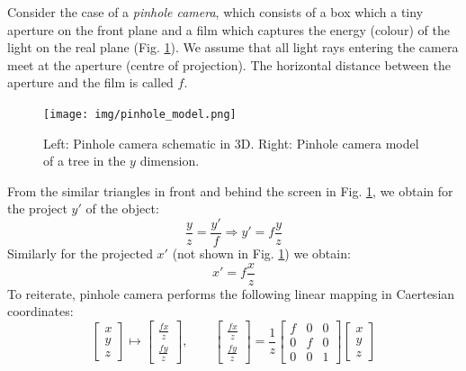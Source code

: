 \documentclass[a4paper]{article}
\begin{document}
%
   Consider the case of a \textit{pinhole camera}, which consists of a box which a tiny aperture on the front plane and a film which captures the energy (colour) of the light on the real plane (Fig. \ref{fig:pinhole_model}). We assume that all light rays entering the camera meet at the aperture (centre of projection). The horizontal distance between the aperture and the film is called  $f$.
    \begin{figure}[H]
        \centering
        \texttt{[image: img/pinhole\_model.png]}
        \caption{Left: Pinhole camera schematic in 3D. Right: Pinhole camera model of a tree in the $y$ dimension.}
        \label{fig:pinhole_model}
    \end{figure}

    From the similar triangles in front and behind the screen in Fig. \ref{fig:pinhole_model}, we obtain for the project $y\prime$ of the object:
    \[
        \frac{y}{z} = \frac{y\prime}{f} \Rightarrow y\prime = f\frac{y}{z}
    \]
    Similarly for the projected $x\prime$ (not shown in Fig. \ref{fig:pinhole_model}) we obtain:
    \[
        x\prime = f\frac{x}{z}
    \]
    To reiterate, pinhole camera performs the following linear mapping in Caertesian coordinates:
    \[
        \begin{bmatrix}
            x \\ y \\ z
        \end{bmatrix} \mapsto
        \begin{bmatrix}
            \frac{fx}{z} \\
            \frac{fy}{z} 
        \end{bmatrix}, \qquad 
        \begin{bmatrix}
            \frac{fx}{z} \\
            \frac{fy}{z} 
        \end{bmatrix} = 
         \frac{1}{z}\begin{bmatrix}
            f & 0 & 0 \\
            0 & f & 0 \\
            0 & 0 & 1
        \end{bmatrix}
        \begin{bmatrix}
            x \\ y \\ z
        \end{bmatrix}
        \]
\end{document}
